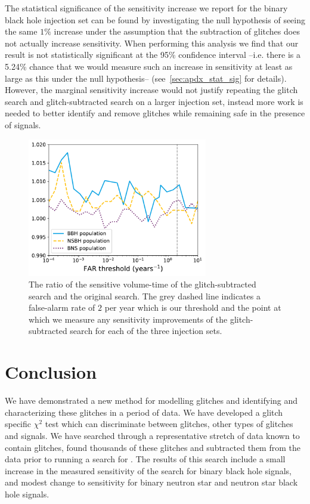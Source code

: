 The statistical significance of the sensitivity increase we report for the binary black hole injection set can be found by investigating the null hypothesis of seeing the same $1\%$ increase under the assumption that the subtraction of \scl{} glitches does not actually increase sensitivity. When performing this analysis we find that our result is not statistically significant at the 95\% confidence interval --i.e. there is a 5.24\% chance that we would measure such an increase in sensitivity at least as large as this under the null hypothesis-- (see~\ref{sec:apdx_stat_sig} for details). However, the marginal sensitivity increase would not justify repeating the \scl{} glitch search and glitch-subtracted \gw{} search on a larger injection set, instead more work is needed to better identify and remove \scl{} glitches while remaining safe in the presence of \gw{} signals.

\begin{figure}
     \centering
     \includegraphics[width=0.7\textwidth]{images/archenemy/Section4/4.1/allinj_vt_ratio_ArchEnemy_coinc.pdf}
     \caption{The ratio of the sensitive volume-time of the glitch-subtracted search and the original \gw{} search. The grey dashed line indicates a false-alarm rate of $2$ per year which is our threshold and the point at which we measure any sensitivity improvements of the glitch-subtracted search for each of the three \gw{} injection sets. }
     \label{fig:allinj_vt_ratio}
\end{figure}

\section{\label{sec:conclusion}Conclusion}

We have demonstrated a new method for modelling \scl{} glitches and identifying and characterizing these glitches in a period of \gw{} data. We have developed a \scl{} glitch specific $\chi^{2}$ test which can discriminate between \scl{} glitches, other types of glitches and \gw{} signals. We have searched through a representative stretch of \gw{} data known to contain \scl{} glitches, found thousands of these glitches and subtracted them from the \gw{} data prior to running a search for \gws{}. The results of this search include a small increase in the measured sensitivity of the \gw{} search for binary black hole \gw{} signals, and modest change to sensitivity for binary neutron star and neutron star black hole \gw{} signals.

